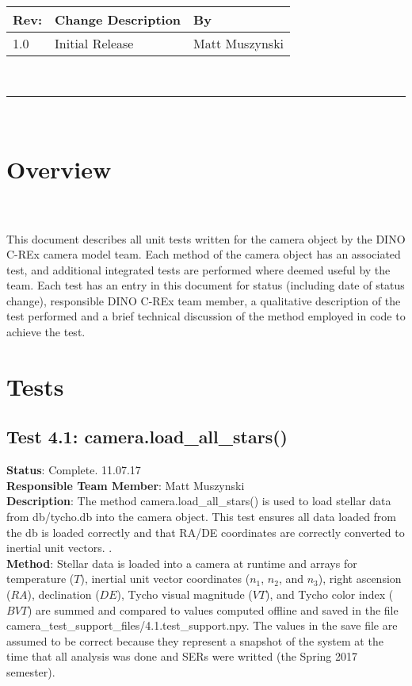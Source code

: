 \documentclass[]{DINOReportMemo}
\begin{document}
\makeCover


%
%
\pagestyle{empty}
{\renewcommand{\arraystretch}{2}
\noindent
\begin{longtable}{|p{0.5in}|p{4.5in}|p{1.14in}|}
\hline
{\bfseries Rev}: & {\bfseries Change Description} & {\bfseries By} \\
\hline
1.0 & Initial Release & Matt Muszynski \\ %
\hline

\end{longtable}
}

\newpage
\setcounter{page}{1}
\pagestyle{fancy}

\tableofcontents
~\\ \hrule ~\\

\newpage
\section{Overview}\\\\
This document describes all unit tests written for the camera object by the DINO C-REx camera model team. Each method of the camera object has an associated test, and additional integrated tests are performed where deemed useful by the team. Each test has an entry in this document for status (including date of status change), responsible DINO C-REx team member, a qualitative description of the test performed and a brief technical discussion of the method employed in code to achieve the test.

\section{Tests}
\subsection{Test 4.1: camera.load\_all\_stars()}
\textbf{Status}: Complete. 11.07.17\\
\textbf{Responsible Team Member}: Matt Muszynski \\
\textbf{Description}: The method camera.load\_all\_stars() is used to load stellar data from db/tycho.db into the camera object. This test ensures all data loaded from the db is loaded correctly and that RA/DE coordinates are correctly converted to inertial unit vectors. .\\
\textbf{Method}: Stellar data is loaded into a camera at runtime and arrays for temperature ($T$), inertial unit vector coordinates ($n_1$, $n_2$, and $n_3$), right ascension ($RA$), declination ($DE$), Tycho visual magnitude ($VT$), and Tycho color index ($BVT$) are summed and compared to values computed offline and saved in the file camera\_test\_support\_files/4.1.test\_support.npy. The values in the save file are assumed to be correct because they represent a snapshot of the system at the time that all analysis was done and SERs were writted (the Spring 2017 semester).\\
\end{document}
